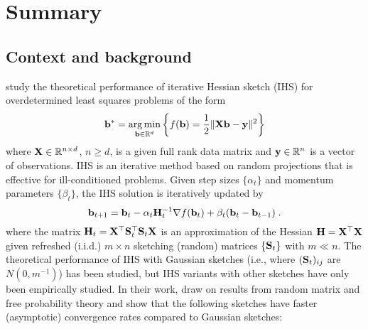 

\section{Summary}

\subsection{Context and background}

\citet{Lacotte:2020} study the theoretical performance of iterative Hessian sketch (IHS) for overdetermined least squares problems of the form
\[
\mathbf{b}^* = \operatorname*{arg\,min}_{\mathbf{b}\in\mathbb{R}^d}\left\{f(\mathbf{b}) = \frac{1}{2}\|\mathbf{X}\mathbf{b}-\mathbf{y}\|^2\right\}
\]
where $\mathbf{X}\in\mathbb{R}^{n\times d}$, $n\geq d$, is a given full rank data matrix and $\mathbf{y}\in\mathbb{R}^n$ is a vector of observations. IHS is an iterative method based on random projections that is effective for ill-conditioned problems. Given step sizes $\{\alpha_t\}$ and momentum parameters $\{\beta_t\}$, the IHS solution is iteratively updated by 
\[
\mathbf{b}_{t+1} = \mathbf{b}_t - \alpha_t\mathbf{H}_t^{-1}\nabla f(\mathbf{b}_t)+\beta_t(\mathbf{b}_t-\mathbf{b}_{t-1}) \;.
\]
where the matrix $\mathbf{H}_t=\mathbf{X}^\top \mathbf{S}_t^\top \mathbf{S}_t\mathbf{X}$ is an approximation of the Hessian $\mathbf{H}=\mathbf{X}^\top\mathbf{X}$ given refreshed (i.i.d.) $m\times n$ sketching (random) matrices $\{\mathbf{S}_t\}$ with $m\ll n$. The theoretical performance of IHS with Gaussian sketches (i.e., where $(\mathbf{S}_t)_{ij}$ are \iid $N(0,m^{-1})$) has been studied, but IHS variants with other sketches have only been empirically studied. In their work, \citet{Lacotte:2020} draw on results from random matrix and free probability theory and show that the following sketches have faster (asymptotic) convergence rates compared to Gaussian sketches:
